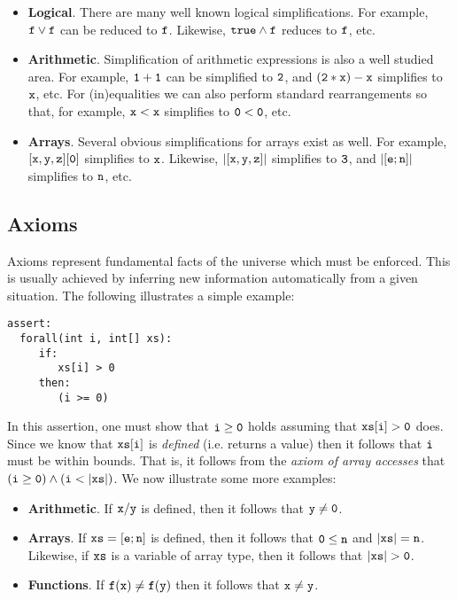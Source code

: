 \begin{itemize}
\item {\bf Logical}.  There are many well known logical
  simplifications.  For example, ${\tt f\lor f}$ can be reduced to
  ${\tt f}$.  Likewise, ${\tt true\land f}$ reduces to ${\tt f}$, etc.
\item {\bf Arithmetic}.  Simplification of arithmetic expressions is
  also a well studied area.  For example, ${\tt 1+1}$ can be
  simplified to ${\tt 2}$, and ${\tt (2*x) - x}$ simplifies to
  ${\tt x}$, etc.  For (in)equalities we can also perform standard
  rearrangements so that, for example, ${\tt x < x}$ simplifies to
  ${\tt 0 < 0}$, etc.
\item {\bf Arrays}.  Several obvious simplifications for arrays exist
  as well.  For example, ${\tt [x,y,z][0]}$ simplifies to ${\tt x}$.
  Likewise, ${\tt |[x,y,z]|}$ simplifies to ${\tt 3}$, and
  ${\tt |[e;n]|}$ simplifies to ${\tt n}$, etc.
\end{itemize}

\subsection{Axioms}

Axioms represent fundamental facts of the universe which must be
enforced.  This is usually achieved by inferring new information
automatically from a given situation.  The following illustrates a
simple example:

\begin{tcolorbox}\begin{lstlisting}[language=WyAL]
assert:
  forall(int i, int[] xs):
     if:
        xs[i] > 0
     then:
        (i >= 0)
\end{lstlisting}\end{tcolorbox}

In this assertion, one must show that ${\tt i \ge 0}$ holds assuming
that ${\tt xs[i] > 0}$ does.  Since we know that ${\tt xs[i]}$ is {\em
  defined} (i.e. returns a value) then it follows that ${\tt i}$ must
be within bounds.  That is, it follows from the {\em axiom of array
  accesses} that ${\tt (i \ge 0)\land(i < |xs|)}$.  We now illustrate
some more examples:

\begin{itemize}
\item {\bf Arithmetic}.  If ${\tt x / y}$ is defined, then it follows
  that ${\tt y \neq 0}$.
\item {\bf Arrays}.  If ${\tt xs=[e;n]}$ is defined, then it follows
  that ${\tt 0 \le n}$ and ${\tt |xs| = n}$.  Likewise, if
  ${\tt xs}$ is a variable of array type, then it follows that
  ${\tt |xs| > 0}$.
\item {\bf Functions}.  If ${\tt f(x) \neq f(y)}$ then it follows that
  ${\tt x\neq y}$.
\end{itemize}

